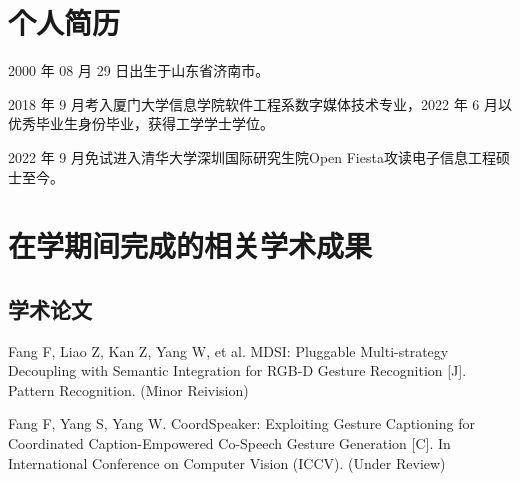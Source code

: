 
\begin{resume}

  \section*{个人简历}

  2000 年 08 月 29 日出生于山东省济南市。

  2018 年 9 月考入厦门大学信息学院软件工程系数字媒体技术专业，2022 年 6 月以优秀毕业生身份毕业，获得工学学士学位。

  2022 年 9 月免试进入清华大学深圳国际研究生院Open Fiesta攻读电子信息工程硕士至今。


  \section*{在学期间完成的相关学术成果}

  \subsection*{学术论文}

  \begin{achievements}
    \item Fang F, Liao Z, Kan Z, Yang W, et al. MDSI: Pluggable Multi-strategy Decoupling with Semantic Integration for RGB-D Gesture Recognition [J]. 
    Pattern Recognition. (Minor Reivision)
    \item Fang F, Yang S, Yang W. CoordSpeaker: Exploiting Gesture Captioning for Coordinated Caption-Empowered Co-Speech Gesture Generation [C]. In International Conference on Computer Vision (ICCV). (Under Review)
  \end{achievements}




\end{resume}

